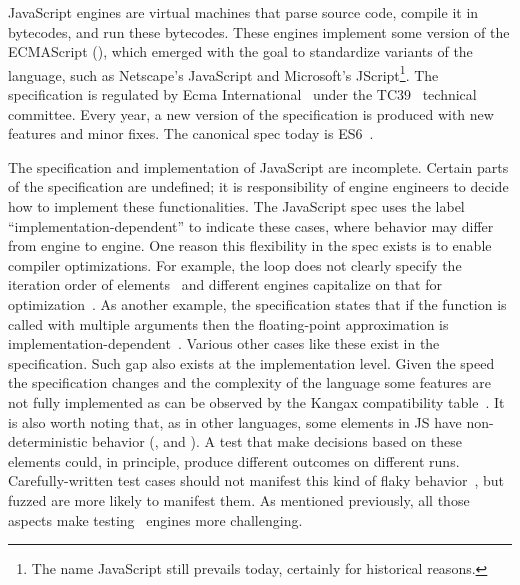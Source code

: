 \documentclass[10pt,conference,anonymous]{IEEEtran}
\begin{document}
JavaScript engines are virtual machines that parse source code,
compile it in bytecodes, and run these bytecodes. These engines
implement some version of the ECMAScript (\es{}), which emerged with
the goal to standardize variants of the language, such as Netscape's
JavaScript and Microsoft's JScript\footnote{The name JavaScript still
  prevails today, certainly for historical reasons.}. The \es{}
specification is regulated by Ecma International~\cite{es6-website}
under the TC39~\cite{tc39-github} technical committee.  Every year, a
new version of the \es{} specification is produced with new features
and minor fixes. The canonical spec today is
ES6~\cite{ecmas262-spec-repo,ecmas262-spec}.


The specification and implementation of JavaScript are
incomplete. Certain parts of the specification are undefined; it is
responsibility of engine engineers to decide how to implement these
functionalities. The JavaScript spec uses the label
``implementation-dependent'' to indicate these cases, where behavior
may differ from engine to engine. One reason this flexibility in the
spec exists is to enable compiler optimizations. For example, the
 loop does not clearly specify the iteration
order of elements~\cite{so-forin-undefined,javascript-in-chrome} and different
engines capitalize on that for optimization~\cite{for-in-undefined}.  As another
example, the specification states that if
the  function is called with multiple arguments then the floating-point approximation is
implementation-dependent~\cite{es6-toPrecision}. Various other cases
like these exist in the specification. Such gap also exists at the
implementation level. Given the speed the specification changes and
the complexity of the language some features are not fully implemented
as can be observed by the Kangax compatibility table~\cite{kangax}.
It is also worth noting that, as in other languages, some
elements in JS have non-deterministic behavior (\eg{},
 and ). A test that make decisions
based on these elements could, in principle, produce different
outcomes on different runs. Carefully-written test cases should not
manifest this kind of
flaky behavior~\cite{luo-etal-fse2014,palomba-zaidman-icsme2017}, but
fuzzed are more likely to manifest them.
As mentioned previously, all those aspects make testing \js\ engines
more challenging.
\end{document}
